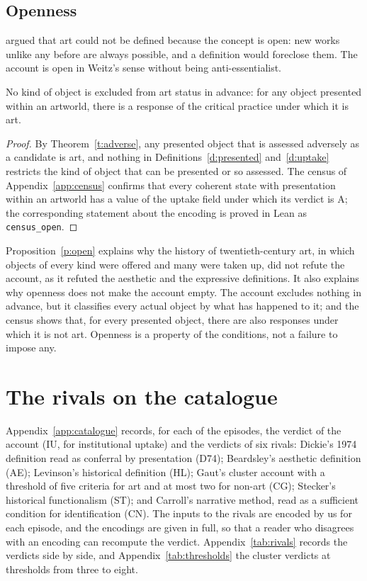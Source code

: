 \documentclass{situationist-preprint}
\begin{document}
\subsection{Openness}

\citet{Weitz1956} argued that art could not be defined because the concept is open: new works unlike any before are always possible, and a definition would foreclose them. The account is open in Weitz's sense without being anti-essentialist.

\begin{proposition}\label{p:open}
No kind of object is excluded from art status in advance: for any object presented within an artworld, there is a response of the critical practice under which it is art.
\end{proposition}

\begin{proof}
By Theorem~\ref{t:adverse}, any presented object that is assessed adversely as a candidate is art, and nothing in Definitions~\ref{d:presented} and~\ref{d:uptake} restricts the kind of object that can be presented or so assessed. The census of Appendix~\ref{app:census} confirms that every coherent state with presentation within an artworld has a value of the uptake field under which its verdict is A; the corresponding statement about the encoding is proved in Lean as \texttt{census\_open}.
\end{proof}

Proposition~\ref{p:open} explains why the history of twentieth-century art, in which objects of every kind were offered and many were taken up, did not refute the account, as it refuted the aesthetic and the expressive definitions. It also explains why openness does not make the account empty. The account excludes nothing in advance, but it classifies every actual object by what has happened to it; and the census shows that, for every presented object, there are also responses under which it is not art. Openness is a property of the conditions, not a failure to impose any.

\section{The rivals on the catalogue}\label{s:rivals}

Appendix~\ref{app:catalogue} records, for each of the \stnepisodes{} episodes, the verdict of the account (IU, for institutional uptake) and the verdicts of six rivals: Dickie's 1974 definition read as conferral by presentation (D74); Beardsley's aesthetic definition (AE); Levinson's historical definition (HL); Gaut's cluster account with a threshold of five criteria for art and at most two for non-art (CG); Stecker's historical functionalism (ST); and Carroll's narrative method, read as a sufficient condition for identification (CN). The inputs to the rivals are encoded by us for each episode, and the encodings are given in full, so that a reader who disagrees with an encoding can recompute the verdict. Appendix~\ref{tab:rivals} records the verdicts side by side, and Appendix~\ref{tab:thresholds} the cluster verdicts at thresholds from three to eight.
\end{document}
